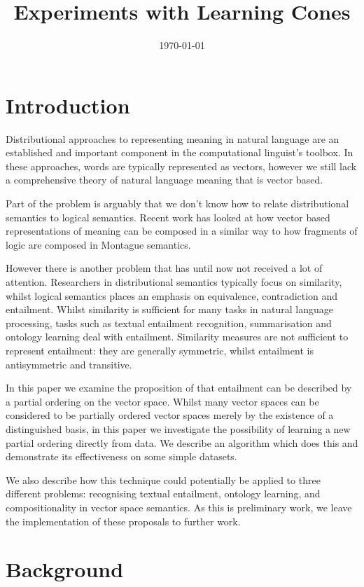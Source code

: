 \documentclass{article}
\title{Experiments with Learning Cones}
\date{\today}
\begin{document}
\maketitle

\section{Introduction}

Distributional approaches to representing meaning in natural language
are an established and important component in the computational
linguist's toolbox. In these approaches, words are typically
represented as vectors, however we still lack a comprehensive theory
of natural language meaning that is vector based.

Part of the problem is arguably that we don't know how to relate
distributional semantics to logical semantics. Recent work has looked
at how vector based representations of meaning can be composed in a
similar way to how fragments of logic are composed in Montague
semantics.

However there is another problem that has until now not received a lot
of attention. Researchers in distributional semantics typically focus
on similarity, whilst logical semantics places an emphasis on
equivalence, contradiction and entailment. Whilst similarity is
sufficient for many tasks in natural language processing, tasks such
as textual entailment recognition, summarisation and ontology learning
deal with entailment. Similarity measures are not sufficient to
represent entailment: they are generally symmetric, whilst entailment
is antisymmetric and transitive.

In this paper we examine the proposition of \cite{Clarke:07} that
entailment can be described by a partial ordering on the vector
space. Whilst many vector spaces can be considered to be partially
ordered vector spaces merely by the existence of a distinguished
basis, in this paper we investigate the possibility of learning a new
partial ordering directly from data. We describe an algorithm which
does this and demonstrate its effectiveness on some simple datasets.

We also describe how this technique could potentially be applied to
three different problems: recognising textual entailment, ontology
learning, and compositionality in vector space semantics. As this is
preliminary work, we leave the implementation of these proposals to
further work.

\section{Background}
\end{document}
